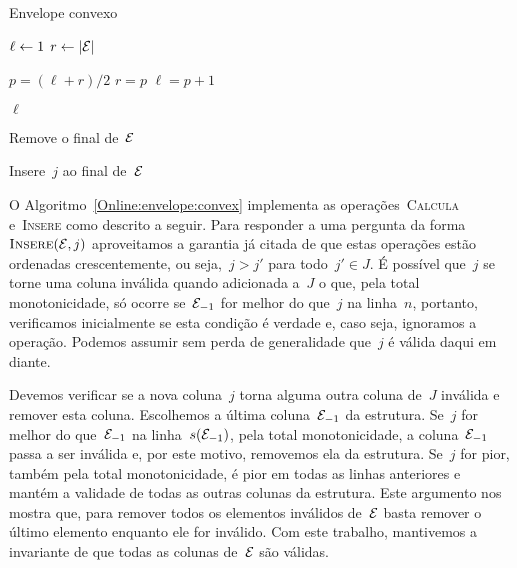 \begin{algorithm}[h]
\caption{Envelope convexo}
\label{Online:envelope:convex}
\begin{algorithmic}[1]
    \State $\ell \leftarrow 1$
    \State $r \leftarrow |\mathcal{E}|$
    
        \State $p = (\ell+r)/2$
            \State $r = p$
        \Else
            \State $\ell = p+1$
        \EndIf
    \EndWhile

    \State \Return $\ell$
\EndFunction

        \State \Return
    \EndIf
    
        \State Remove o final de~$\mathcal{E}$
    \EndWhile

    \State Insere~$j$ ao final de~$\mathcal{E}$
\EndFunction
\end{algorithmic}
\end{algorithm}

O Algoritmo~\ref{Online:envelope:convex} implementa as operações~\textsc{Calcula} e~\textsc{Insere} como descrito a seguir. Para responder a uma pergunta da forma~$\textsc{Insere}(\mathcal{E},j)$ aproveitamos a garantia já citada de que estas operações estão ordenadas crescentemente, ou seja,~$j > j'$ para todo~$j' \in J$. É possível que~$j$ se torne uma coluna inválida quando adicionada a~$J$ o que, pela total monotonicidade, só ocorre se~$\mathcal{E}_{-1}$ for melhor do que~$j$ na linha~$n$, portanto, verificamos inicialmente se esta condição é verdade e, caso seja, ignoramos a operação. Podemos assumir sem perda de generalidade que~$j$ é válida daqui em diante.

Devemos verificar se a nova coluna~$j$ torna alguma outra coluna de~$J$ inválida e remover esta coluna. Escolhemos a última coluna~$\mathcal{E}_{-1}$ da estrutura. Se~$j$ for melhor do que~$\mathcal{E}_{-1}$ na linha~$s(\mathcal{E}_{-1})$, pela total monotonicidade, a coluna~$\mathcal{E}_{-1}$ passa a ser inválida e, por este motivo, removemos ela da estrutura. Se~$j$ for pior, também pela total monotonicidade, é pior em todas as linhas anteriores e mantém a validade de todas as outras colunas da estrutura. Este argumento nos mostra que, para remover todos os elementos inválidos de~$\mathcal{E}$ basta remover o último elemento enquanto ele for inválido. Com este trabalho, mantivemos a invariante de que todas as colunas de~$\mathcal{E}$ são válidas.

